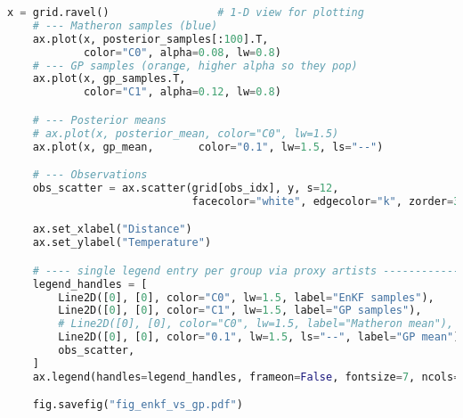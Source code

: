 \documentclass[wcp]{jmlr} %
\begin{document}
\begin{lstlisting}[language=Python, caption={Minimal Python for the experiment.}, label={lst:demo}]
    x = grid.ravel()                 # 1-D view for plotting
    # --- Matheron samples (blue)
    ax.plot(x, posterior_samples[:100].T,
            color="C0", alpha=0.08, lw=0.8)
    # --- GP samples (orange, higher alpha so they pop)
    ax.plot(x, gp_samples.T,
            color="C1", alpha=0.12, lw=0.8)

    # --- Posterior means
    # ax.plot(x, posterior_mean, color="C0", lw=1.5)
    ax.plot(x, gp_mean,       color="0.1", lw=1.5, ls="--")

    # --- Observations
    obs_scatter = ax.scatter(grid[obs_idx], y, s=12,
                             facecolor="white", edgecolor="k", zorder=3, label="Observation")

    ax.set_xlabel("Distance")
    ax.set_ylabel("Temperature")

    # ---- single legend entry per group via proxy artists -------------------
    legend_handles = [
        Line2D([0], [0], color="C0", lw=1.5, label="EnKF samples"),
        Line2D([0], [0], color="C1", lw=1.5, label="GP samples"),
        # Line2D([0], [0], color="C0", lw=1.5, label="Matheron mean"),
        Line2D([0], [0], color="0.1", lw=1.5, ls="--", label="GP mean"),
        obs_scatter,
    ]
    ax.legend(handles=legend_handles, frameon=False, fontsize=7, ncols=2)

    fig.savefig("fig_enkf_vs_gp.pdf")

\end{lstlisting}
\end{document}
